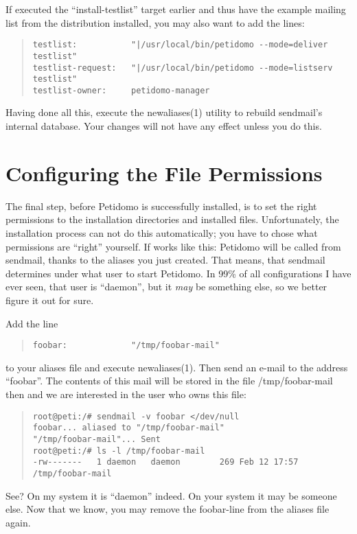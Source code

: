 \documentclass[a4paper,10pt]{scrreprt}
\newcommand{\file}[1]{{\sf #1}}
\begin{document}
If executed the ``install-testlist'' target earlier and thus have the
example mailing list from the distribution installed, you may also
want to add the lines:
\begin{quote}
\begin{verbatim}
testlist:           "|/usr/local/bin/petidomo --mode=deliver testlist"
testlist-request:   "|/usr/local/bin/petidomo --mode=listserv testlist"
testlist-owner:     petidomo-manager
\end{verbatim}
\end{quote}
Having done all this, execute the newaliases(1) utility to rebuild
sendmail's internal database. Your changes will not have any effect
unless you do this.

\section{Configuring the File Permissions}

The final step, before Petidomo is successfully installed, is to set
the right permissions to the installation directories and installed
files. Unfortunately, the installation process can not do this
automatically; you have to chose what permissions are ``right''
yourself. If works like this: Petidomo will be called from sendmail,
thanks to the aliases you just created. That means, that sendmail
determines under what user to start Petidomo. In 99\% of all
configurations I have ever seen, that user is ``daemon'', but it
\emph{may} be something else, so we better figure it out for sure.

Add the line
\begin{quote}
\begin{verbatim}
foobar:             "/tmp/foobar-mail"
\end{verbatim}
\end{quote}
to your aliases file and execute newaliases(1). Then send an e-mail to
the address ``foobar''. The contents of this mail will be stored in
the file \file{/tmp/foobar-mail} then and we are interested in the user
who owns this file:
\begin{quote}
\begin{verbatim}
root@peti:/# sendmail -v foobar </dev/null
foobar... aliased to "/tmp/foobar-mail"
"/tmp/foobar-mail"... Sent
root@peti:/# ls -l /tmp/foobar-mail
-rw-------   1 daemon   daemon        269 Feb 12 17:57 /tmp/foobar-mail
\end{verbatim}
\end{quote}
See? On my system it is ``daemon'' indeed. On your system it may be
someone else. Now that we know, you may remove the foobar-line from
the aliases file again.
\end{document}
